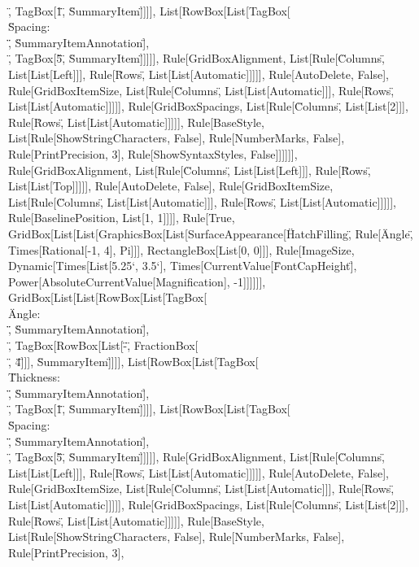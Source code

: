 \documentclass{article}
\begin{document}
{{{{\"\\[InvisibleSpace]\", TagBox[\"1\", \"SummaryItem\"]]]], List[RowBox[List[TagBox[\"\\\"Spacing: \\\"\", \"SummaryItemAnnotation\"], \"\\[InvisibleSpace]\",
TagBox[\"5\", \"SummaryItem\"]]]]], Rule[GridBoxAlignment, List[Rule[\"Columns\", List[List[Left]]], Rule[\"Rows\", List[List[Automatic]]]]], Rule[AutoDelete,
False], Rule[GridBoxItemSize, List[Rule[\"Columns\", List[List[Automatic]]], Rule[\"Rows\", List[List[Automatic]]]]], Rule[GridBoxSpacings, List[Rule[\"Columns\",
List[List[2]]], Rule[\"Rows\", List[List[Automatic]]]]], Rule[BaseStyle, List[Rule[ShowStringCharacters, False], Rule[NumberMarks, False], Rule[PrintPrecision,
3], Rule[ShowSyntaxStyles, False]]]]]], Rule[GridBoxAlignment, List[Rule[\"Columns\", List[List[Left]]], Rule[\"Rows\", List[List[Top]]]]], Rule[AutoDelete,
False], Rule[GridBoxItemSize, List[Rule[\"Columns\", List[List[Automatic]]], Rule[\"Rows\", List[List[Automatic]]]]], Rule[BaselinePosition, List[1,
1]]]], Rule[True, GridBox[List[List[GraphicsBox[List[SurfaceAppearance[\"HatchFilling\", Rule[\"Angle\", Times[Rational[-1, 4], Pi]]], RectangleBox[List[0,
0]]], Rule[ImageSize, Dynamic[Times[List[5.25`, 3.5`], Times[CurrentValue[\"FontCapHeight\"], Power[AbsoluteCurrentValue[Magnification], -1]]]]]],
GridBox[List[List[RowBox[List[TagBox[\"\\\"Angle: \\\"\", \"SummaryItemAnnotation\"], \"\\[InvisibleSpace]\", TagBox[RowBox[List[\"-\", FractionBox[\"\\[Pi]\",
\"4\"]]], \"SummaryItem\"]]]], List[RowBox[List[TagBox[\"\\\"Thickness: \\\"\", \"SummaryItemAnnotation\"], \"\\[InvisibleSpace]\", TagBox[\"1\",
\"SummaryItem\"]]]], List[RowBox[List[TagBox[\"\\\"Spacing: \\\"\", \"SummaryItemAnnotation\"], \"\\[InvisibleSpace]\", TagBox[\"5\", \"SummaryItem\"]]]]],
Rule[GridBoxAlignment, List[Rule[\"Columns\", List[List[Left]]], Rule[\"Rows\", List[List[Automatic]]]]], Rule[AutoDelete, False], Rule[GridBoxItemSize,
List[Rule[\"Columns\", List[List[Automatic]]], Rule[\"Rows\", List[List[Automatic]]]]], Rule[GridBoxSpacings, List[Rule[\"Columns\", List[List[2]]],
Rule[\"Rows\", List[List[Automatic]]]]], Rule[BaseStyle, List[Rule[ShowStringCharacters, False], Rule[NumberMarks, False], Rule[PrintPrecision, 3],
}}}}
\end{document}
